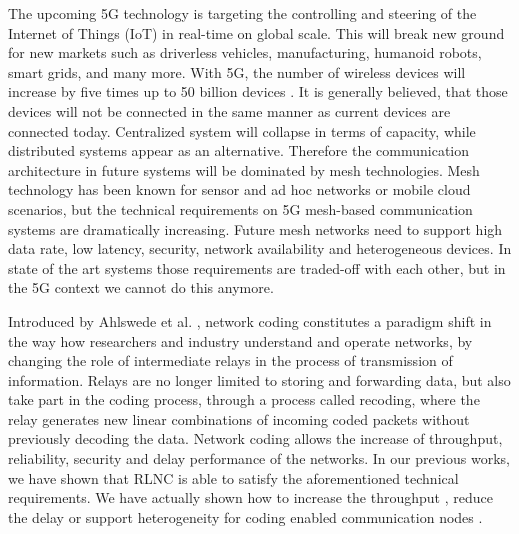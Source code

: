 %

The upcoming 5G technology is targeting the controlling and steering of the Internet of Things (IoT) in real-time on global scale. This will break new ground for new markets such as driverless vehicles, manufacturing, humanoid robots, smart grids, and many more. With 5G, the number of wireless devices will increase by five times up to 50 billion devices \cite{cisco2011forecast}. It is generally believed, that those devices will not be connected in the same manner as current devices are connected today. Centralized system will collapse in terms of capacity, while distributed systems appear as an alternative. Therefore the communication architecture in future systems will be dominated by mesh technologies. Mesh technology has been known for sensor and ad hoc networks or mobile cloud scenarios, but the technical requirements on 5G mesh-based communication systems are dramatically increasing. Future mesh networks need to support high data rate, low latency, security, network availability and heterogeneous devices. In state of the art systems those requirements are traded-off with each other, but in the 5G context we cannot do this anymore.

Introduced by Ahlswede et al. \cite{ahlswede2000network}, network coding constitutes a paradigm shift in the way how researchers and industry understand and operate networks, by changing the role of intermediate relays in the process of transmission of information. Relays are no longer limited to storing and forwarding data, but also take part in the coding process, through a process called recoding, where the relay generates new linear combinations of incoming coded packets without previously decoding the data. Network coding allows the increase of throughput, reliability, security and delay performance of the networks. In our previous works, we have shown that \ac{RLNC} \cite{koetter2003algebraic,ho2006random} is able to satisfy the aforementioned technical requirements. We have actually shown how to increase the throughput \cite{pahlevani2013playncool}, reduce the delay \cite{szabo2015towards} or support heterogeneity for coding enabled communication nodes \cite{lucani2014fulcrum}.

